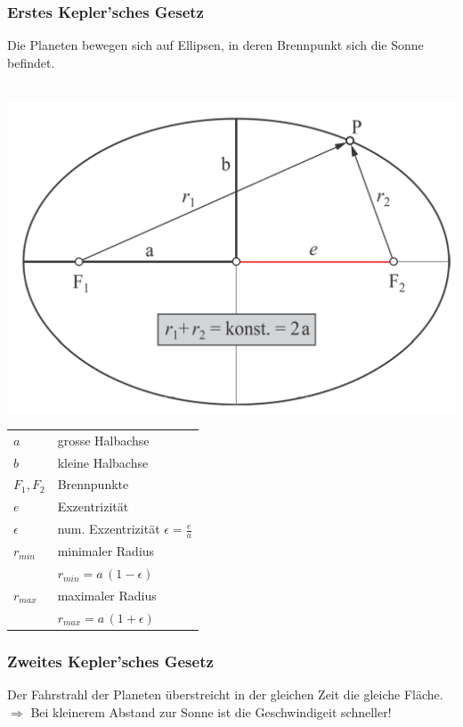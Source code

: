 	\subsubsection{Erstes Kepler'sches Gesetz}
	Die Planeten bewegen sich auf Ellipsen, in deren Brennpunkt sich die Sonne befindet. \\
	\\
	\begin{minipage}{0.45\linewidth}
	\includegraphics[width=\linewidth]{Bilder/ellipse}
	\end{minipage}
	\hfill
	\begin{minipage}{0.53\linewidth}
	\begin{tabular}{ll}
	$a$ & grosse Halbachse \\
	$b$ & kleine Halbachse \\
	$F_1, F_2$ & Brennpunkte \\
	$e$ & Exzentrizität \\
	$\epsilon$ & num. Exzentrizität $\epsilon = \frac{e}{a} $\\	
	$r_{min}$ & minimaler Radius \\	
	& $r_{min} = a \,(1 - \epsilon)$ \\
	$r_{max}$ & maximaler Radius \\
	& $r_{max} = a \,(1 + \epsilon)$ \\
	\end{tabular}
	
	\end{minipage}
	
	
	
	
	
	
	\subsubsection{Zweites Kepler'sches Gesetz}
	Der Fahrstrahl der Planeten überstreicht in der gleichen Zeit die gleiche Fläche. \\
	$\Rightarrow$ Bei kleinerem Abstand zur Sonne ist die Geschwindigeit schneller! \\
	
